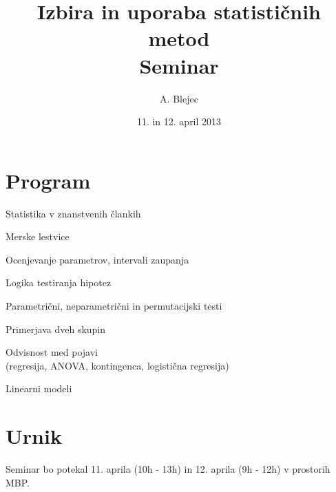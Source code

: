 \documentclass[a4paper,12pt]{article}
\begin{document}
\title{Izbira in uporaba statističnih metod\\Seminar}
\author{A. Blejec}
%

\date{11. in 12. april 2013}%
\maketitle

\section*{Program}

\begin{itemize*}
  \item Statistika v znanstvenih člankih
  \item Merske lestvice
  \item Ocenjevanje parametrov, intervali zaupanja
  \item Logika testiranja hipotez
  \item Parametrični, neparametrični in permutacijski testi
  \item Primerjava dveh skupin
  \item Odvisnost med pojavi\\ (regresija, ANOVA, kontingenca, logistična regresija)
  \item Linearni modeli
\end{itemize*}
\section*{Urnik}
Seminar bo potekal 11. aprila (10h - 13h) in 12. aprila (9h - 12h) v prostorih MBP.


%
%
\end{document}
